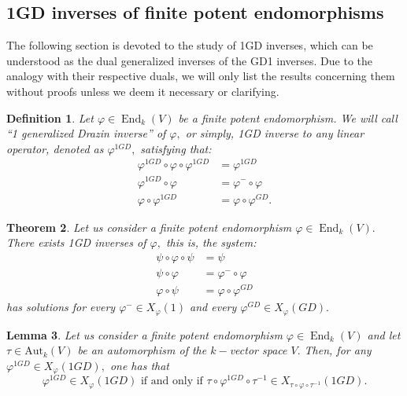 \documentclass[10pt,a4paper]{amsart}
\newtheorem{defn}{Definition}
\newtheorem{thm}[defn]{Theorem}
\newtheorem{lem}[defn]{Lemma}
\theoremstyle{plain}
\theoremstyle{remark}
\numberwithin{equation}{section} \numberwithin{defn}{section}
\newcommand\ed{\operatorname{End}}
\newcommand{\f}{\varphi}
\newcommand{\g}{\psi}
\begin{document}
\smallskip







\subsection{1GD inverses of finite potent endomorphisms}\label{ss: 1GD fp}

The following section is devoted to the study of 1GD inverses, which can be understood as the dual generalized inverses of the GD1 inverses. Due to the analogy with their respective duals, we will only list the results concerning them without proofs unless we deem it necessary or clarifying. 


\begin{defn}\label{D: 1GD }
Let $\f\in \ed_k(V)$ be a finite potent endomorphism. We will call ``1 generalized Drazin inverse'' of $\f,$ or simply, 1GD inverse  to any linear operator,  denoted as $\f^{1GD},$ satisfying that: \begin{align*}
\f^{1GD}\circ \f \circ \f^{1GD} & = \f^{1GD}\\
\f^{1GD}\circ \f & = \f^{-}\circ \f \\
\f \circ \f^{1GD} &= \f \circ \f^{GD}. 
\end{align*}
\end{defn}

\begin{thm}\label{T: Existencia 1GD}
Let us consider a finite potent endomorphism $\f \in \ed_k(V).$ There exists 1GD inverses of $\f,$ this is, the system: \begin{align*}
\g\circ \f \circ \g &= \g \\
\g \circ \f & = \f^- \circ \f \\
\f \circ \g & = \f \circ \f^{GD}
\end{align*} has solutions for every $\f^-\in X_{\f}(1)$ and every $\f^{GD}\in X_{\f}(GD).$
\end{thm}


\begin{lem}\label{L: 1GD inv conj}
Let us consider a finite potent endomorphism $\f \in \ed_k(V)$ and let $\tau \in \mathrm{Aut}_k(V)$ be an automorphism of the $k-$vector space $V.$ Then, for any $\f^{1GD}\in X_{\f}(1GD),$ one has that $$\f^{1GD}\in X_{\f}(1GD) \text{ if and only if }\tau \circ \f^{1GD} \circ \tau^{-1}\in X_{\tau \circ \f \circ \tau^{-1}}(1GD). $$ 
\end{lem}
\end{document}
